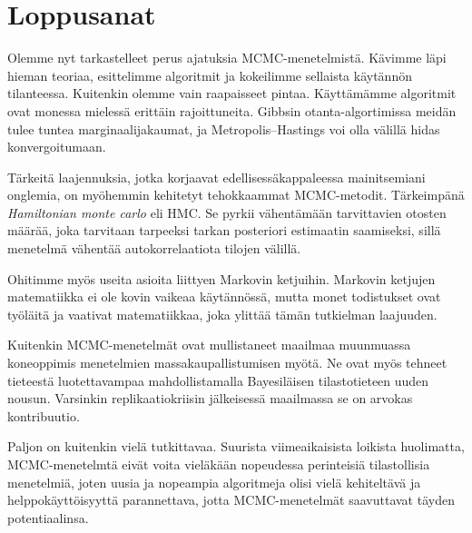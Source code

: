 \chapter{Loppusanat}

Olemme nyt tarkastelleet perus ajatuksia MCMC-menetelmistä. Kävimme läpi hieman teoriaa, esittelimme algoritmit ja kokeilimme sellaista käytännön tilanteessa. Kuitenkin olemme vain raapaisseet pintaa. Käyttämämme algoritmit ovat monessa mielessä erittäin rajoittuneita. Gibbsin otanta-algortimissa meidän tulee tuntea marginaalijakaumat, ja Metropolis--Hastings voi olla välillä hidas konvergoitumaan. 

Tärkeitä laajennuksia, jotka korjaavat edellisessäkappaleessa mainitsemiani onglemia, on myöhemmin kehitetyt tehokkaammat MCMC-metodit. Tärkeimpänä \textit{Hamiltonian monte carlo} eli HMC. Se pyrkii vähentämään tarvittavien otosten määrää, joka tarvitaan tarpeeksi tarkan posteriori estimaatin saamiseksi, sillä menetelmä vähentää autokorrelaatiota tilojen välillä.

Ohitimme myös useita asioita liittyen Markovin ketjuihin. Markovin ketjujen matematiikka ei ole  kovin vaikeaa käytännössä, mutta monet todistukset ovat työläitä ja vaativat matematiikkaa, joka ylittää tämän tutkielman laajuuden.

Kuitenkin MCMC-menetelmät ovat mullistaneet maailmaa muunmuassa koneoppimis menetelmien massakaupallistumisen myötä. Ne ovat myös tehneet tieteestä luotettavampaa mahdollistamalla Bayesiläisen tilastotieteen uuden nousun. Varsinkin replikaatiokriisin jälkeisessä maailmassa se on arvokas kontribuutio.

Paljon on kuitenkin vielä tutkittavaa. Suurista viimeaikaisista loikista huolimatta, MCMC-menetelmtä eivät voita vieläkään nopeudessa perinteisiä tilastollisia menetelmiä, joten uusia ja nopeampia algoritmeja olisi vielä kehiteltävä ja helppokäyttöisyyttä parannettava, jotta MCMC-menetelmät saavuttavat täyden potentiaalinsa.